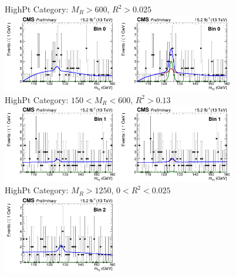 \begin{figure}[ht!]
\centering
HighPt Category: $M_{R}>600$\GeV, $R^{2}>0.025$\\
\includegraphics[width=0.45\textwidth, angle=0.]{figs/unblindedResults2p3Plus12p9/bin0_fit_b.png}
\includegraphics[width=0.45\textwidth, angle=0.]{figs/unblindedResults2p3Plus12p9/bin0_fit_s.png}\\
HighPt Category: $150 < M_{R} < 600$\GeV, $R^{2}>0.13$\\
\includegraphics[width=0.45\textwidth, angle=0.]{figs/unblindedResults2p3Plus12p9/bin1_fit_b.png}
\includegraphics[width=0.45\textwidth, angle=0.]{figs/unblindedResults2p3Plus12p9/bin1_fit_s.png}\\
HighPt Category: $M_{R}>1250$\GeV, $0 < R^{2} < 0.025$\\
\includegraphics[width=0.45\textwidth, angle=0.]{figs/unblindedResults2p3Plus12p9/bin2_fit_b.png}

\end{figure}
